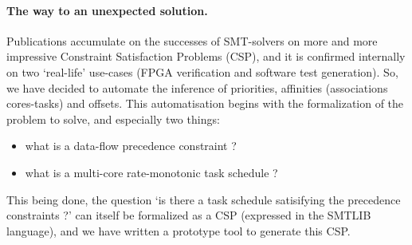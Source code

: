 \documentclass[a4paper]{article}
\begin{document}
\paragraph*{The way to an unexpected solution.}

Publications accumulate on the successes of SMT-solvers on more and more impressive Constraint Satisfaction Problems (CSP),
and it is confirmed internally on two `real-life' use-cases (FPGA verification and software test generation).
So, we have decided to automate the inference of priorities, affinities (associations cores-tasks) and offsets.
This automatisation begins with the formalization of the problem to solve, and especially two things:
\begin{itemize}
\item what is a data-flow precedence constraint ?
\item what is a multi-core rate-monotonic task schedule ?
\end{itemize}
This being done, the question `is there a task schedule satisifying the precedence constraints ?' can itself be formalized as a CSP (expressed in the SMTLIB language),
and we have written a prototype tool to generate this CSP.
\end{document}
